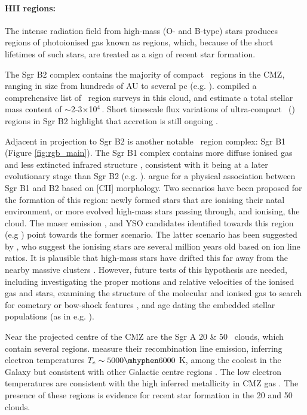 \paragraph{HII regions:}\label{sec:hiiregions}
The intense radiation field from high-mass (O- and B-type) stars produces regions of photoionised gas known as \hii regions, which, because of the short lifetimes of such stars, are treated as a sign of recent star formation.  

The Sgr B2 complex contains the majority of compact \hii\ regions in the CMZ, ranging in size from hundreds of AU to several pc (e.g. \citealp{Gaume1995, dePree1995, dePree1996}).
\citet{Schmiedeke2016} compiled a comprehensive list of \hii\ region surveys  in this cloud, and estimate a total stellar mass content of $\sim$2-3$\times$10$^4$\,\msun.
Short timescale flux variations of ultra-compact \hii\ (\uchii) regions in Sgr B2 highlight that accretion is still ongoing \citep{DePree2015}. 

Adjacent in projection to Sgr B2 is another notable \hii\ region complex: Sgr B1 (Figure \ref{fig:rgb_main}). 
The Sgr B1 complex contains more diffuse ionised gas and less extincted infrared structure \citep{Mehringer1992}, consistent with it being at a later evolutionary stage than Sgr B2 (e.g. \citealp{Barnes2020b}).
\citet{Harris2021} argue for a physical association between Sgr B1 and B2 based on [CII] morphology.
Two scenarios have been proposed for the formation of this region: newly formed stars that are ionising their natal environment, or more evolved high-mass stars passing through, and ionising, the cloud.  
The maser emission \citep{Mehringer1993}, and YSO candidates identified towards this region (e.g \citealp{An2011,An2017}) point towards the former scenario. 
The latter scenario has been suggested by \citet{Simpson2018a, Simpson2021}, who suggest the ionising stars are several million years old based on ion line ratios. 
It is plausible that high-mass stars have drifted this far away from the nearby massive clusters \citep[][ \S\,\ref{sec:starclusters}]{Habibi2014}.
However, future tests of this hypothesis are needed, including investigating the proper motions and relative velocities of the ionised gas and stars, examining the structure of the molecular and ionised gas to search for cometary or bow-shock features \citep{Henshaw2022}, and age dating the embedded stellar populations (as in e.g. \citealp{Nogueras-Lara2020b}).

Near the projected centre of the CMZ are the Sgr A 20 \& 50 \kms\ clouds, which contain several \hii regions. \citet{Tsuboi2019} measure their recombination line emission, inferring electron temperatures $T_e\sim5000\mhyphen6000$ K, among the coolest in the Galaxy but consistent with other Galactic centre \hii regions \citep{Mills2011}.
The low electron temperatures are consistent with the high inferred metallicity in CMZ gas \citep{Balser2011}. The presence of these \hii regions is evidence for recent star formation in the 20 and 50 \kms clouds.

